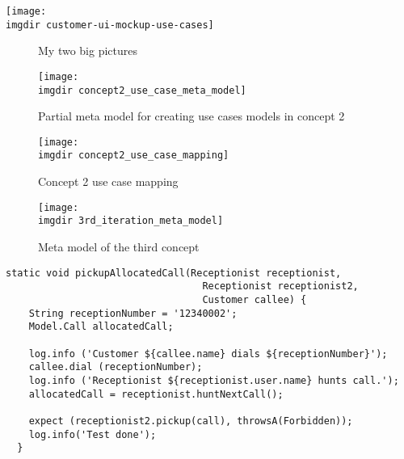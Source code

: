 \documentclass[aspectratio=43]{beamer}
\newcommand{\imgdir}{../Thesis/img/}
\begin{document}
\texttt{[image: \\imgdir customer-ui-mockup-use-cases]}

\begin{figure}[ht]
\centering
{}\hfill
{}
\caption{My two big pictures}
\label{fig:subfigures}
\end{figure}

\begin{figure}[h]
  \centering
  \texttt{[image: \\imgdir concept2\_use\_case\_meta\_model]}
  \caption{Partial meta model for creating use cases models in concept 2}
  \label{fig:concept2_use_case_meta_model}
\end{figure}

\begin{figure}[!htbp]
  \centering
  \texttt{[image: \\imgdir concept2\_use\_case\_mapping]}
  \caption{Concept 2 use case mapping}
  \label{fig:concept2_use_case_mapping}
\end{figure}

\begin{figure}[!htbp]
  \centering
  \texttt{[image: \\imgdir 3rd\_iteration\_meta\_model]}
  \caption{Meta model of the third concept}
  \label{fig:3rd_iteration_meta_model}
\end{figure}

\begin{lstlisting}[style=Dart, caption=Test code for single call allocation,label={lst:test-code-single-call-allocation}]
  static void pickupAllocatedCall(Receptionist receptionist, 
                                  Receptionist receptionist2, 
                                  Customer callee) {
    String receptionNumber = '12340002';
    Model.Call allocatedCall;
    
    log.info ('Customer ${callee.name} dials ${receptionNumber}');
    callee.dial (receptionNumber);
    log.info ('Receptionist ${receptionist.user.name} hunts call.');
    allocatedCall = receptionist.huntNextCall();
   
    expect (receptionist2.pickup(call), throwsA(Forbidden));
    log.info('Test done');
  }
\end{lstlisting}

\end{document}
